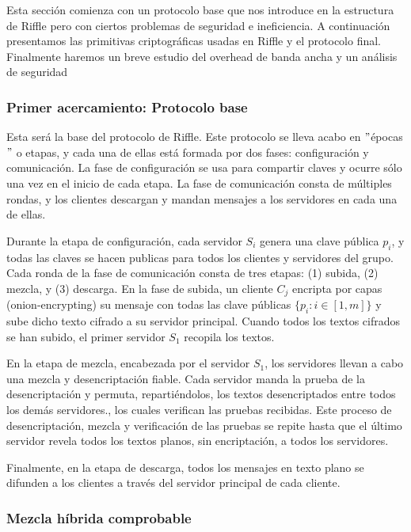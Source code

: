 Esta sección comienza con un protocolo base que nos introduce en la estructura de Riffle pero con ciertos problemas de seguridad e ineficiencia. A continuación presentamos las primitivas criptográficas usadas en Riffle y el protocolo final. Finalmente haremos un breve estudio del overhead de banda ancha y un análisis de seguridad

\subsubsection{Primer acercamiento: Protocolo base}
Esta será la base del protocolo de Riffle. Este protocolo se lleva acabo en $"$épocas$"$ o etapas, y cada una de ellas está formada por dos fases: configuración y comunicación. La fase de configuración se usa para compartir claves y ocurre sólo una vez en el inicio de cada etapa. La fase de comunicación consta de múltiples rondas, y los clientes descargan y mandan mensajes a los servidores en cada una de ellas.

Durante la etapa de configuración, cada servidor $S_i$ genera una clave pública $p_i$, y todas las claves se hacen publicas para todos los clientes y servidores del grupo. Cada ronda de la fase de comunicación consta de tres etapas: (1) subida, (2) mezcla, y (3) descarga. En la fase de subida, un cliente $C_j$ encripta por capas (onion-encrypting) su mensaje con todas las clave públicas $\{p_i:i \in [1,m]\}$ y sube dicho texto cifrado a su servidor principal. Cuando todos los textos cifrados se han subido, el primer servidor $S_1$ recopila los textos. 

En la etapa de mezcla, encabezada por el servidor $S_1$, los servidores llevan a cabo una mezcla y desencriptación fiable. Cada servidor manda la prueba de la desencriptación y permuta, repartiéndolos, los textos desencriptados entre todos los demás servidores., los cuales verifican las pruebas recibidas. Este proceso de desencriptación, mezcla y verificación de las pruebas se repite hasta que el último servidor revela todos los textos planos, sin encriptación, a todos los servidores.

Finalmente, en la etapa de descarga, todos los mensajes en texto plano se difunden a los clientes a través del servidor principal de cada cliente. 

\subsubsection{Mezcla híbrida comprobable}

